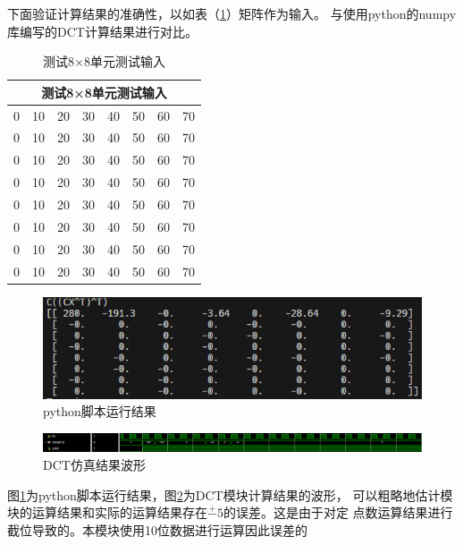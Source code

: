 \documentclass{article}
\numberwithin {equation}{section}
\begin{document}
\begin{spacing}{1.25}
    下面验证计算结果的准确性，以如表（\ref{testMatrix}）矩阵作为输入。
    与使用python的numpy库编写的DCT计算结果进行对比。
    \begin{table}[H]
      \caption{测试8×8单元测试输入}
      \label{testMatrix}
      \centering
      \begin{tabular}{cccccccc}
        \toprule
        \multicolumn{8}{c}{测试8×8单元测试输入}\\
        \midrule
        0 & 10 & 20 & 30 & 40 & 50 & 60 & 70 \\
        0 & 10 & 20 & 30 & 40 & 50 & 60 & 70 \\
        0 & 10 & 20 & 30 & 40 & 50 & 60 & 70 \\
        0 & 10 & 20 & 30 & 40 & 50 & 60 & 70 \\
        0 & 10 & 20 & 30 & 40 & 50 & 60 & 70 \\
        0 & 10 & 20 & 30 & 40 & 50 & 60 & 70 \\
        0 & 10 & 20 & 30 & 40 & 50 & 60 & 70 \\
        0 & 10 & 20 & 30 & 40 & 50 & 60 & 70 \\
        \bottomrule
      \end{tabular}
    \end{table}

    \begin{figure}[H]
      \centering
      \includegraphics[scale=0.8]{./pictures/python脚本运行结果.png}
      \caption{python脚本运行结果}
      \label{py result}
    \end{figure}
    \begin{figure}[H]
      \centering
      \includegraphics[scale=0.3725]{./pictures/DCTSimulationResult.png}
      \caption{ DCT仿真结果波形}
      \label{result simulation}
    \end{figure}

    图\ref{py result}为python脚本运行结果，图\ref{result simulation}为DCT模块计算结果的波形，
    可以粗略地估计模块的运算结果和实际的运算结果存在$\stackrel{+}{-}5$的误差。这是由于对定
    点数运算结果进行截位导致的。本模块使用10位数据进行运算因此误差的

\end{spacing}
\end{document}

